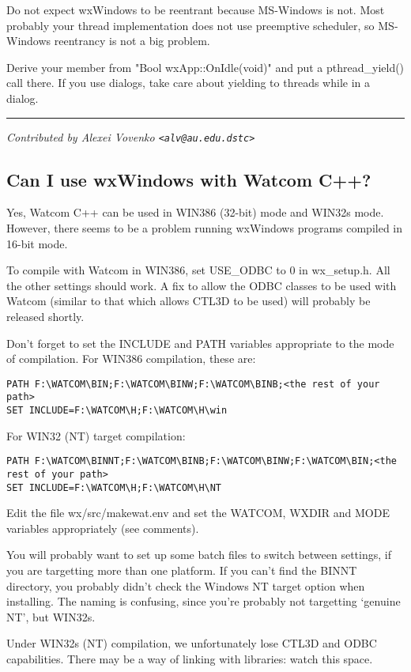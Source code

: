 Do not expect wxWindows to be reentrant because MS-Windows is not.   
Most probably your thread implementation does not use preemptive scheduler,
so MS-Windows reentrancy is not a big problem.

Derive your member from "Bool wxApp::OnIdle(void)" 
and put a pthread\_yield() call there. If you use dialogs, take care about
yielding to threads while in a dialog.

\hrule
{\it Contributed by Alexei Vovenko \verb$<alv@au.edu.dstc>$}

\subsection{Can I use wxWindows with Watcom C++?}

Yes, Watcom C++ can be used in WIN386 (32-bit) mode and WIN32s mode. However, there
seems to be a problem running wxWindows programs compiled in 16-bit
mode.

To compile with Watcom in WIN386, set USE\_ODBC to 0 in wx\_setup.h. All
the other settings should work. A fix to allow the ODBC classes to be
used with Watcom (similar to that which allows CTL3D to be used) will
probably be released shortly.

Don't forget to set the INCLUDE and PATH variables appropriate to
the mode of compilation. For WIN386 compilation, these are:

\begin{verbatim}
PATH F:\WATCOM\BIN;F:\WATCOM\BINW;F:\WATCOM\BINB;<the rest of your path>
SET INCLUDE=F:\WATCOM\H;F:\WATCOM\H\win
\end{verbatim}

For WIN32 (NT) target compilation:

\begin{verbatim}
PATH F:\WATCOM\BINNT;F:\WATCOM\BINB;F:\WATCOM\BINW;F:\WATCOM\BIN;<the rest of your path>
SET INCLUDE=F:\WATCOM\H;F:\WATCOM\H\NT
\end{verbatim}

Edit the file wx/src/makewat.env and set the WATCOM, WXDIR and MODE
variables appropriately (see comments).

You will probably want to set up some batch files to switch between
settings, if you are targetting more than one platform. If you can't
find the BINNT directory, you probably didn't check the Windows NT
target option when installing. The naming is confusing, since you're
probably not targetting `genuine NT', but WIN32s.

Under WIN32s (NT) compilation, we unfortunately lose CTL3D and
ODBC capabilities. There may be a way of linking with libraries:
watch this space.
 
